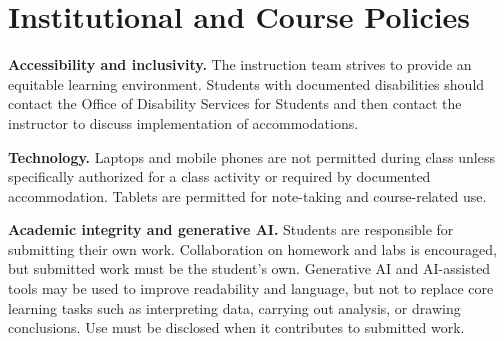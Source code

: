 \section*{Institutional and Course Policies}
\textbf{Accessibility and inclusivity.} The instruction team strives to provide an equitable learning environment. Students with documented disabilities should contact the Office of Disability Services for Students and then contact the instructor to discuss implementation of accommodations.

\textbf{Technology.} Laptops and mobile phones are not permitted during class unless specifically authorized for a class activity or required by documented accommodation. Tablets are permitted for note-taking and course-related use.

\textbf{Academic integrity and generative AI.} Students are responsible for submitting their own work. Collaboration on homework and labs is encouraged, but submitted work must be the student's own. Generative AI and AI-assisted tools may be used to improve readability and language, but not to replace core learning tasks such as interpreting data, carrying out analysis, or drawing conclusions. Use must be disclosed when it contributes to submitted work.
